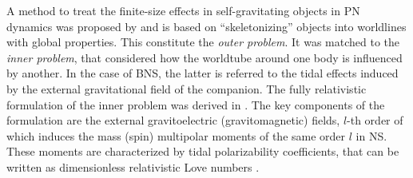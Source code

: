 A method to treat the finite-size effects in self-gravitating objects in \ac{PN} 
dynamics was proposed by \citet{Damour:1983a} and is based on ``skeletonizing'' 
objects into worldlines with global properties. This constitute the \textit{outer problem}.
%
It was matched to the \textit{inner problem}, that considered how the worldtube 
around one body is influenced by another. In the case of \ac{BNS}, the latter is 
referred to the tidal effects induced by the external gravitational field of the companion. 
The fully relativistic formulation of the inner problem was derived in 
\citet{Hinderer:2007mb,Damour:2009vw,Binnington:2009bb}. 
%
%
The key components of the formulation are the external gravitoelectric 
(gravitomagnetic) fields, $l$-th order of which induces the mass (spin) multipolar moments 
of the same order $l$ in \ac{NS}. These moments are characterized by %
tidal polarizability coefficients, that can be written as dimensionless relativistic 
Love numbers \citep{Damour:2009vw,Binnington:2009bb}.
%
